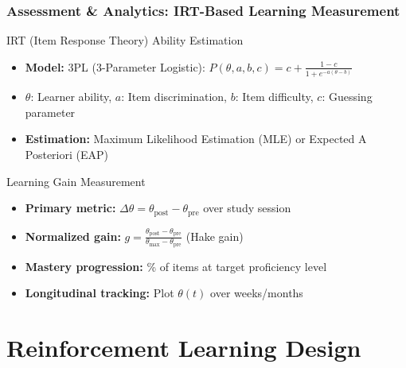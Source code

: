 \documentclass[aspectratio=169]{beamer}
\begin{document}
\begin{frame}
\frametitle{Assessment \& Analytics: IRT-Based Learning Measurement}
\begin{block}{IRT (Item Response Theory) Ability Estimation}
\begin{itemize}
\item \textbf{Model:} 3PL (3-Parameter Logistic): $P(\theta, a, b, c) = c + \frac{1-c}{1 + e^{-a(\theta - b)}}$
\item $\theta$: Learner ability, $a$: Item discrimination, $b$: Item difficulty, $c$: Guessing parameter
\item \textbf{Estimation:} Maximum Likelihood Estimation (MLE) or Expected A Posteriori (EAP)
\end{itemize}
\end{block}

\begin{block}{Learning Gain Measurement}
\begin{itemize}
\item \textbf{Primary metric:} $\Delta\theta = \theta_{\text{post}} - \theta_{\text{pre}}$ over study session
\item \textbf{Normalized gain:} $g = \frac{\theta_{\text{post}} - \theta_{\text{pre}}}{\theta_{\text{max}} - \theta_{\text{pre}}}$ (Hake gain)
\item \textbf{Mastery progression:} \% of items at target proficiency level
\item \textbf{Longitudinal tracking:} Plot $\theta(t)$ over weeks/months
\end{itemize}
\end{block}
\end{frame}

\section{Reinforcement Learning Design}
\end{document}
